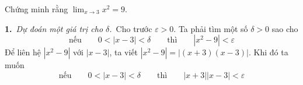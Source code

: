 \begin{minipage}[t]{0.68\textwidth}
    \vspace{1.2em}
    \hspace{1.2em}Chứng minh rằng $\lim_{x \to 3} x^2 = 9$.

    \vspace{0.4em}

    \vspace{0.3em}
    \textbf{1.}\ \textit{Dự đoán một giá trị cho $\delta$.}\ Cho trước $\varepsilon > 0$. Ta phải tìm một số $\delta > 0$ sao cho
    \[
    \text{nếu}\qquad 0 < |x - 3| < \delta \qquad\text{thì}\qquad |x^2 - 9| < \varepsilon
    \]
    Để liên hệ $|x^2 - 9|$ với $|x - 3|$, ta viết $|x^2 - 9| = |(x + 3)(x - 3)|$. Khi đó ta muốn
    \[
    \text{nếu}\qquad 0 < |x - 3| < \delta \qquad\text{thì}\qquad |x + 3||x - 3| < \varepsilon
    \]
\end{minipage}
